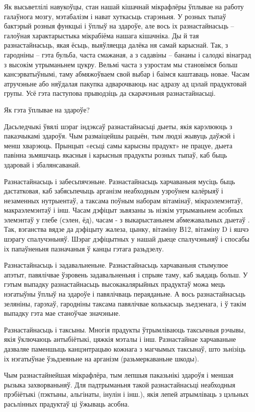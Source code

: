 Як высьветлілі навукоўцы, стан нашай кішачнай мікрафлёры ўплывае на работу галаўнога мозгу, мэтабалізм і нават хуткасьць старэньня. У розных тыпаў бактэрый розныя функцыі і ўплыў на здароўе, але вось іх разнастайнасьць – галоўная характарыстыка мікрабіёма нашага кішачніка.
Ды й тая разнастайнасьць, якая ёсьць, выяўляецца далёка ня самай карыснай. Так, з гародніны – гэта бульба, часта смажаная, а з садавіны – бананы і салодкі вінаград з высокім утрыманьнем цукру. Вельмі часта з узростам мы становімся больш кансэрватыўнымі, таму абмяжоўваем свой выбар і баімся каштаваць новае. Часам атручэньне або няўдалая пакупка адварочваюць нас адразу ад цэлай прадуктовай групы. Усё гэта паступова прыводзіць да скарачэньня разнастайнасьці.

Як гэта ўплывае на здароўе?

Дасьледчыкі ўвялі шэраг індэксаў разнастайнасьці дыеты, якія карэлююць з паказчыкамі здароўя. Чым размаіцейшы рацыён, тым людзі жывуць даўжэй і менш хварэюць. Прынцып «есьці самы карысны прадукт» не працуе, дыета павінна зьмяшчаць якасныя і карысныя прадукты розных тыпаў, каб быць здаровай і збалянсаванай.

Разнастайнасьць і забесьпячэньне.
Разнастайнасьць харчаваньня мусіць быць дастатковая, каб забясьпечыць арганізм неабходным узроўнем калёрыяў і незаменных нутрыентаў, а таксама поўным наборам вітамінаў, мікраэлемэнтаў, макраэлемэнтаў і інш. Часам дэфіцыт зьвязаны зь нізкім утрыманьнем асобных элемэнтаў у глебе (сэлен, ёд), часам - з выкарыстаньнем абмежавальных дыетаў . Так, вэганства вядзе да дэфіцыту жалеза, цынку, вітаміну В12, вітаміну D і яшчэ шэрагу спалучэньняў. Шэраг дэфіцытных у нашай дыеце спалучэньняў і спосабы іх папаўненьня пазначаныя ў канцы гэтага разьдзелу.

Разнастайнасьць і задавальненьне.
Разнастайнасьць харчаваньня стымулюе апэтыт, павялічвае ўзровень задавальненьня і спрыяе таму, каб зьядаць больш. У гэтым выпадку разнастайнасьць высокакалярыйных прадуктаў можа мець нэгатыўны ўплыў на здароўе і павялічваць пераяданьне. А вось разнастайнасьць зеляніны, гарэхаў, гародніны таксама павялічвае колькасьць зьедзенага, і ў такім выпадку гэта мае станоўчае значэньне.

Разнастайнасьць і таксыны.
Многія прадукты ўтрымліваюць таксычныя рэчывы, якія ўключаюць антыбіётыкі, цяжкія мэталы і інш. Разнастайнае харчаваньне дазваляе паменшыць канцэнтрацыю кожнага з магчымых таксынаў, што зьнізіць іх нэгатыўнае ўзьдзеяньне на арганізм (разьмеркаваньне шкоды).

Чым разнастайнейшая мікрафлёра, тым лепшыя паказьнікі здароўя і меншая рызыка захворваньняў. Для падтрыманьня такой разнастайнасьці неабходныя прэбіётыкі (пэктыны, альгінаты, інулін і інш.), якія лепей атрымліваць з цэльных расьлінных прадуктаў ці ўжываць асобна.

